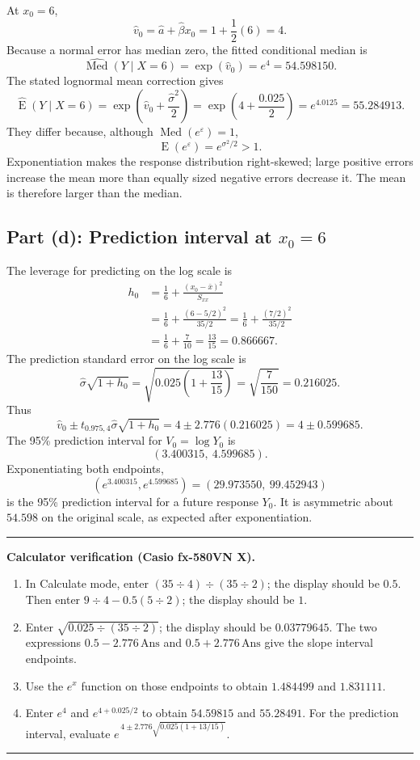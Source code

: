 \documentclass[11pt]{article}
\newcommand{\E}{\operatorname{E}}
\newcommand{\answer}[1]{\boxed{\displaystyle #1}}
\newenvironment{checkbox}
  {\par\medskip\noindent\begin{minipage}{\linewidth}
   \color{navy!90!black}\hrule\medskip
   \textbf{\sffamily Calculator verification (Casio fx-580VN X).}\ }
  {\medskip\hrule\end{minipage}\par\medskip}
\begin{document}
At \(x_0=6\),
\[
\hat v_0=\hat a+\hat\beta x_0=1+\frac12(6)=4.
\]
Because a normal error has median zero, the fitted conditional median is
\[
\widehat{\operatorname{Med}}(Y\mid X=6)
=\exp(\hat v_0)=\answer{e^4=54.598150}.
\]
The stated lognormal mean correction gives
\[
\widehat{\E}(Y\mid X=6)
=\exp\left(\hat v_0+\frac{\hat\sigma^2}{2}\right)
=\exp\left(4+\frac{0.025}{2}\right)
=\answer{e^{4.0125}=55.284913}.
\]
They differ because, although \(\operatorname{Med}(e^\varepsilon)=1\),
\[
\E(e^\varepsilon)=e^{\sigma^2/2}>1.
\]
Exponentiation makes the response distribution right-skewed; large positive
errors increase the mean more than equally sized negative errors decrease it.
The mean is therefore larger than the median.

\subsection{Part (d): Prediction interval at \(x_0=6\)}

The leverage for predicting on the log scale is
\begin{align*}
h_0
&=\frac16+\frac{(x_0-\bar x)^2}{S_{xx}}\\
&=\frac16+\frac{(6-5/2)^2}{35/2}
=\frac16+\frac{(7/2)^2}{35/2}\\
&=\frac16+\frac7{10}
=\answer{\frac{13}{15}=0.866667}.
\end{align*}
The prediction standard error on the log scale is
\[
\hat\sigma\sqrt{1+h_0}
=\sqrt{0.025\left(1+\frac{13}{15}\right)}
=\sqrt{\frac7{150}}
=0.216025.
\]
Thus
\[
\hat v_0\pm t_{0.975,4}\hat\sigma\sqrt{1+h_0}
=4\pm2.776(0.216025)
=4\pm0.599685.
\]
The 95\% prediction interval for \(V_0=\log Y_0\) is
\[
\answer{(3.400315,\ 4.599685)}.
\]
Exponentiating both endpoints,
\[
\answer{(e^{3.400315},e^{4.599685})
=(29.973550,\ 99.452943)}
\]
is the 95\% prediction interval for a future response \(Y_0\). It is
asymmetric about \(54.598\) on the original scale, as expected after
exponentiation.

\begin{checkbox}
\begin{enumerate}
\item In Calculate mode, enter
\((35\div4)\div(35\div2)\); the display should be \(0.5\).
Then enter \(9\div4-0.5(5\div2)\); the display should be \(1\).
\item Enter
\(\sqrt{0.025\div(35\div2)}\); the display should be \(0.03779645\).
The two expressions
\(0.5-2.776\,\text{Ans}\) and \(0.5+2.776\,\text{Ans}\)
give the slope interval endpoints.
\item Use the \(e^x\) function on those endpoints to obtain
\(1.484499\) and \(1.831111\).
\item Enter \(e^4\) and \(e^{4+0.025/2}\) to obtain \(54.59815\) and
\(55.28491\). For the prediction interval, evaluate
\(e^{\,4\pm2.776\sqrt{0.025(1+13/15)}}\).
\end{enumerate}
\end{checkbox}
\end{document}

